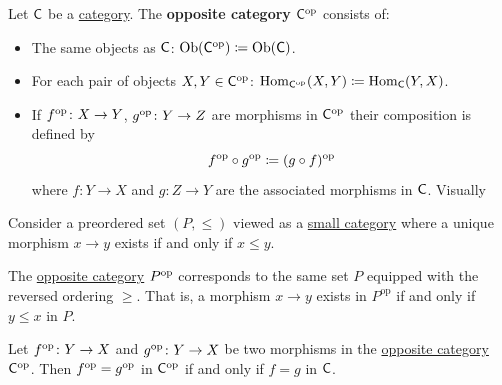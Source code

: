 \documentclass[../../main]{subfiles}
\begin{document}
\begin{definition}\label{def:opposite-category}
  Let \(\mathsf{C}\) be a \hyperref[def:category]{category}. The \textbf{opposite category} \(\mathsf{C}^{\operatorname*{op}}\) consists of:
  \begin{itemize}
    \item The same objects as \(\mathsf{C}\): \(\operatorname{Ob}(\mathsf{C}^{\operatorname*{op}}) \coloneq \operatorname{Ob}(\mathsf{C})\).
    \item For each pair of objects \(X, Y \in \mathsf{C}^{\operatorname*{op}}\): \(\operatorname{Hom}_{\mathsf{C}^{\operatorname*{op}}}(X, Y) \coloneq \operatorname{Hom}_{\mathsf{C}}(Y, X)\).
    \item If \(f^{\operatorname*{op}}\colon X \to Y\), \(g^{\operatorname*{op}}\colon Y \to Z\) are morphisms in \(\mathsf{C}^{\operatorname*{op}}\) their composition is defined by
          \begin{equation*}
            f^{\operatorname*{op}} \circ g^{\operatorname*{op}} \coloneq (g \circ f)^{\operatorname*{op}}
          \end{equation*}
          where \(f\colon Y \to X\) and \(g\colon Z \to Y\) are the associated morphisms in \(\mathsf{C}\).
          Visually
          \begin{center}
          \end{center}
  \end{itemize}
\end{definition}

\begin{example}\label{ex:poset-category-dual}
  Consider a preordered set \((P, \leq)\) viewed as a \hyperref[def:small-category]{small category} where a unique morphism \(x \to y\) exists if and only if \(x \leq y\).

  The \hyperref[def:opposite-category]{opposite category} \(P^{\operatorname*{op}}\) corresponds to the same set \(P\) equipped with the reversed ordering \(\geq\). That is, a morphism \(x \to y\) exists in \(P^{\text{op}}\) if and only if \(y \leq x\) in \(P\).
\end{example}

\begin{remark}
  Let \(f^{\operatorname*{op}}\colon Y \to X\) and \(g^{\operatorname*{op}}\colon Y \to X\) be two morphisms in the \hyperref[def:opposite-category]{opposite category} \(\mathsf{C}^{\operatorname*{op}}\).
  Then \(f^{\operatorname*{op}} = g^{\operatorname*{op}}\) in \(\mathsf{C}^{\operatorname*{op}}\) if and only if \(f = g\) in \(\mathsf{C}\).
\end{remark}
\end{document}
